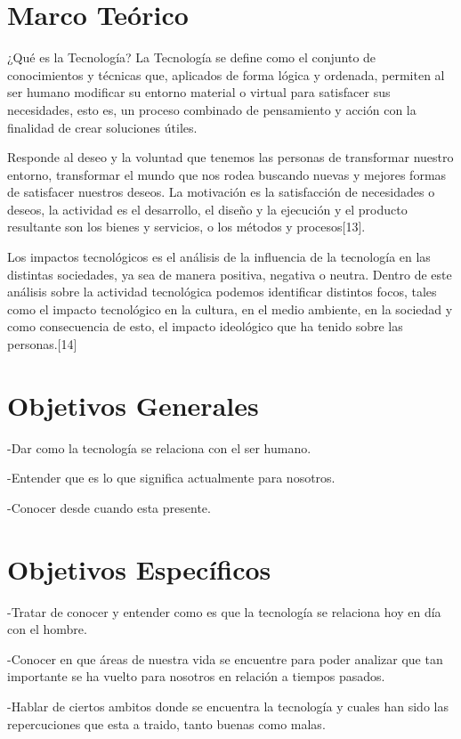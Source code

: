\documentclass{bmcart}
\begin{document}
\section*{Marco Teórico}
¿Qué es la Tecnología? La Tecnología se define como el conjunto de conocimientos y técnicas que, aplicados de forma lógica y ordenada, permiten al ser humano modificar su entorno material o virtual para satisfacer sus necesidades, esto es, un proceso combinado de pensamiento y acción con la finalidad de crear soluciones útiles.\smallskip

Responde al deseo y la voluntad que tenemos las personas de transformar nuestro entorno, transformar el mundo que nos rodea buscando nuevas y mejores formas de satisfacer nuestros deseos. La motivación es la satisfacción de necesidades o deseos, la actividad es el desarrollo, el diseño y la ejecución y el producto resultante son los bienes y servicios, o los métodos y procesos[13].\smallskip

Los impactos tecnológicos es el análisis de la influencia de la tecnología en las distintas sociedades, ya sea de manera positiva, negativa o neutra. Dentro de este análisis sobre la actividad tecnológica podemos identificar distintos focos, tales como el impacto tecnológico en la cultura, en el medio ambiente, en la sociedad y como consecuencia de esto, el impacto ideológico que ha tenido sobre las personas.[14]\smallskip


\section*{Objetivos Generales}
\smallskip
-Dar como la tecnología se relaciona con el ser humano.\smallskip

-Entender que es lo que significa actualmente para nosotros.\smallskip

-Conocer desde cuando esta presente.

\section*{Objetivos Específicos}
\smallskip
-Tratar de conocer y entender como es que la tecnología se relaciona hoy en día con el hombre.\smallskip

-Conocer en que áreas de nuestra vida se encuentre para poder analizar que tan importante se ha vuelto para nosotros en relación a tiempos pasados.\smallskip

-Hablar de ciertos ambitos donde se encuentra la tecnología y cuales han sido las repercuciones que esta a traido, tanto buenas como malas.\smallskip
\end{document}
